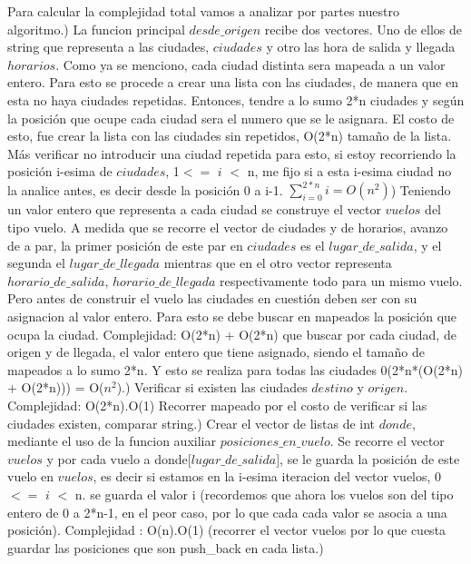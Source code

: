 \documentclass[a4paper]{article}
\begin{document}
Para calcular la complejidad total vamos a analizar por partes nuestro algoritmo.) La funcion principal $desde\_origen$ recibe dos vectores. Uno de ellos de string que representa a las ciudades, $ciudades$ y otro las hora de salida y llegada $horarios$. Como ya se menciono, cada ciudad distinta sera mapeada a un valor entero. Para esto se procede a crear una lista con las ciudades, de manera que en esta no haya ciudades repetidas. Entonces, tendre a lo sumo 2*n ciudades y según la posición que ocupe cada ciudad sera el numero que se le asignara. El costo de esto, fue crear la lista con las ciudades sin repetidos,  O(2*n) tamaño de la lista. Más verificar no introducir una ciudad repetida para esto, si estoy recorriendo la posición i-esima de $ciudades$, 1$<=$ $i$ $<$ n,  me fijo si a esta i-esima ciudad no la analice antes, es decir desde la posición 0 a i-1. \newline
$\sum_{i=0}^{2*n}{i}= O(n^{2})$) Teniendo un valor entero que representa a cada ciudad se construye el vector $vuelos$ del tipo  vuelo. A medida que se recorre el vector de ciudades y de horarios, avanzo de a par, la primer posición de este par en $ciudades$ es el $lugar\_de\_salida$, y el segunda el $lugar\_de\_llegada$ mientras que en el otro vector representa $horario\_de\_salida$, $horario\_de\_llegada$ respectivamente todo para un mismo vuelo. Pero antes de construir el vuelo las ciudades en cuestión  deben ser con su asignacion al valor entero. Para esto se debe buscar en mapeados la posición que ocupa la ciudad. Complejidad:
O(2*n) + O(2*n) que buscar por cada ciudad, de origen y de llegada, el valor entero que tiene asignado, siendo el tamaño de mapeados a lo sumo 2*n. Y esto se realiza para todas las ciudades 0(2*n*(O(2*n) + O(2*n))) = O($n^{2}$).) Verificar si existen las ciudades $destino$ y $origen$. Complejidad: O(2*n).O(1) Recorrer mapeado por el costo de verificar si las ciudades existen, comparar string.) Crear el vector de listas de int $donde$, mediante el uso de la funcion auxiliar $posiciones\_en\_vuelo$. Se recorre el vector $vuelos$ y por cada vuelo a donde[$lugar\_de\_salida]$, se le guarda la posición de este vuelo en $vuelos$, es decir si estamos en la i-esima iteracion del vector vuelos, 0$<=$ $i$ $<$ n. se guarda el valor i (recordemos que ahora los vuelos son del tipo entero de 0 a 2*n-1, en el peor caso, por lo que cada cada valor se asocia a una posición). Complejidad : O(n).O(1) (recorrer el vector vuelos por lo que cuesta guardar las posiciones que son push\_back en cada lista.)\newline
\end{document}
